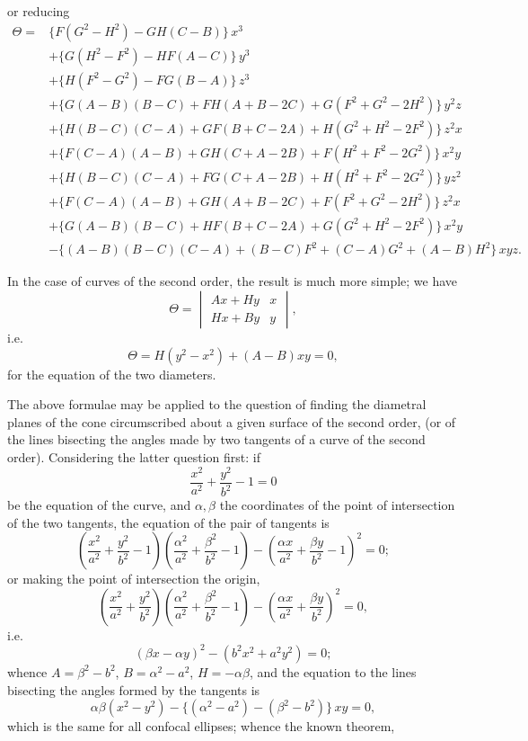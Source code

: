 \documentclass[11pt]{article}
\begin{document}
or reducing
\begin{align*}
\Theta = {}& \{F(G^2 - H^2) - GH(C - B)\}\,x^3\\
& + \{G(H^2 - F^2) - HF(A - C)\}\,y^3\\
& + \{H(F^2 - G^2) - FG(B - A)\}\,z^3\\
& + \{G(A - B)(B - C) + FH(A + B - 2C) + G(F^2 + G^2 - 2H^2)\}\,y^2 z\\
& + \{H(B - C)(C - A) + GF(B + C - 2A) + H(G^2 + H^2 - 2F^2)\}\,z^2 x\\
& + \{F(C - A)(A - B) + GH(C + A - 2B) + F(H^2 + F^2 - 2G^2)\}\,x^2 y\\
& + \{H(B - C)(C - A) + FG(C + A - 2B) + H(H^2 + F^2 - 2G^2)\}\,y z^2\\
& + \{F(C - A)(A - B) + GH(A + B - 2C) + F(F^2 + G^2 - 2H^2)\}\,z^2 x\\
& + \{G(A - B)(B - C) + HF(B + C - 2A) + G(G^2 + H^2 - 2F^2)\}\,x^2 y\\
& - \{(A - B)(B - C)(C - A) + (B - C)F^2 + (C - A)G^2 + (A - B)H^2\}\,xyz.
\end{align*}

In the case of curves of the second order, the result is much more simple; we have
\[
\Theta = \begin{vmatrix} Ax + Hy & x \\ Hx + By & y \end{vmatrix},
\]
i.e.
\[
\Theta = H(y^2 - x^2) + (A - B)xy = 0,
\]
for the equation of the two diameters.

The above formulae may be applied to the question of finding the diametral planes of the cone circumscribed about a given surface of the second order, (or of the lines bisecting the angles made by two tangents of a curve of the second order). Considering the latter question first: if
\[
\frac{x^2}{a^2} + \frac{y^2}{b^2} - 1 = 0
\]
be the equation of the curve, and $\alpha, \beta$ the coordinates of the point of intersection of the two tangents, the equation of the pair of tangents is
\[
\left(\frac{x^2}{a^2} + \frac{y^2}{b^2} - 1\right)\!\!\left(\frac{\alpha^2}{a^2} + \frac{\beta^2}{b^2} - 1\right) - \left(\frac{\alpha x}{a^2} + \frac{\beta y}{b^2} - 1\right)^{\!2} = 0;
\]
or making the point of intersection the origin,
\[
\left(\frac{x^2}{a^2} + \frac{y^2}{b^2}\right)\!\!\left(\frac{\alpha^2}{a^2} + \frac{\beta^2}{b^2} - 1\right) - \left(\frac{\alpha x}{a^2} + \frac{\beta y}{b^2}\right)^{\!2} = 0,
\]
i.e.
\[
(\beta x - \alpha y)^2 - (b^2 x^2 + a^2 y^2) = 0;
\]
whence $A = \beta^2 - b^2$, $B = \alpha^2 - a^2$, $H = -\alpha\beta$, and the equation to the lines bisecting the angles formed by the tangents is
\[
\alpha\beta(x^2 - y^2) - \{(\alpha^2 - a^2) - (\beta^2 - b^2)\}\,xy = 0,
\]
which is the same for all confocal ellipses; whence the known theorem,
\end{document}

